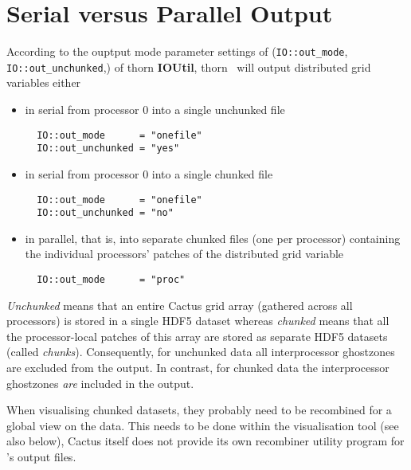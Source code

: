 \documentclass{article}
\begin{document}
\section{Serial versus Parallel Output}

According to the ouptput mode parameter settings of ({\tt IO::out\_mode},
{\tt IO::out\_unchunked},) of thorn
{\bf IOUtil}, thorn \ThisThorn\ will output distributed grid variables either

\begin{itemize}
  \item in serial from processor 0 into a single unchunked file
\begin{verbatim}
  IO::out_mode      = "onefile"
  IO::out_unchunked = "yes"
\end{verbatim}

  \item in serial from processor 0 into a single chunked file
\begin{verbatim}
  IO::out_mode      = "onefile"
  IO::out_unchunked = "no"
\end{verbatim}

  \item in parallel, that is, into separate chunked files (one per processor)
        containing the individual processors' patches of the
        distributed grid variable
\begin{verbatim}
  IO::out_mode      = "proc"
\end{verbatim}
\end{itemize}

{\em Unchunked} means that an entire Cactus grid array (gathered across all
processors) is stored in a single HDF5 dataset whereas {\em chunked} means
that all the processor-local patches of this array are stored as separate
HDF5 datasets (called {\it chunks}).
Consequently, for unchunked data all interprocessor ghostzones are excluded
from the output.  In contrast, for chunked data the interprocessor ghostzones
\emph{are} included in the output.

When visualising chunked datasets, they probably need to be recombined
for a global view on the data. This needs to be done within the visualisation
tool (see also below), Cactus itself does not provide its own recombiner
utility program for \ThisThorn's output files.
\end{document}
